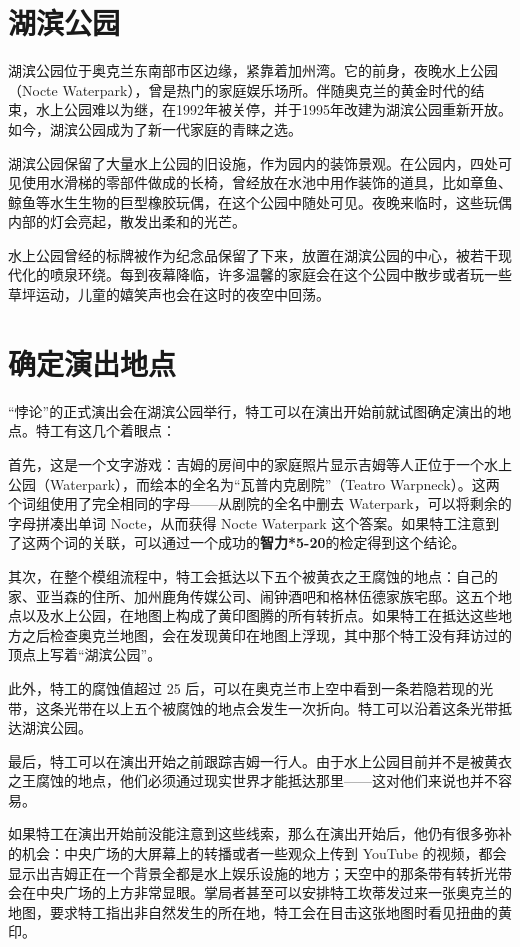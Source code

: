 \section{湖滨公园}

湖滨公园位于奥克兰东南部市区边缘，紧靠着加州湾。它的前身，夜晚水上公园（Nocte Waterpark），曾是热门的家庭娱乐场所。伴随奥克兰的黄金时代的结束，水上公园难以为继，在1992年被关停，并于1995年改建为湖滨公园重新开放。如今，湖滨公园成为了新一代家庭的青睐之选。

湖滨公园保留了大量水上公园的旧设施，作为园内的装饰景观。在公园内，四处可见使用水滑梯的零部件做成的长椅，曾经放在水池中用作装饰的道具，比如章鱼、鲸鱼等水生生物的巨型橡胶玩偶，在这个公园中随处可见。夜晚来临时，这些玩偶内部的灯会亮起，散发出柔和的光芒。

水上公园曾经的标牌被作为纪念品保留了下来，放置在湖滨公园的中心，被若干现代化的喷泉环绕。每到夜幕降临，许多温馨的家庭会在这个公园中散步或者玩一些草坪运动，儿童的嬉笑声也会在这时的夜空中回荡。

\section{确定演出地点}

“悖论”的正式演出会在湖滨公园举行，特工可以在演出开始前就试图确定演出的地点。特工有这几个着眼点：

首先，这是一个文字游戏：吉姆的房间中的家庭照片显示吉姆等人正位于一个水上公园（Waterpark），而绘本的全名为“瓦普内克剧院”（Teatro Warpneck）。这两个词组使用了完全相同的字母——从剧院的全名中删去 Waterpark，可以将剩余的字母拼凑出单词 Nocte，从而获得 Nocte Waterpark 这个答案。如果特工注意到了这两个词的关联，可以通过一个成功的\textbf{智力*5-20}的检定得到这个结论。

其次，在整个模组流程中，特工会抵达以下五个被黄衣之王腐蚀的地点：自己的家、亚当森的住所、加州鹿角传媒公司、闹钟酒吧和格林伍德家族宅邸。这五个地点以及水上公园，在地图上构成了黄印图腾的所有转折点。如果特工在抵达这些地方之后检查奥克兰地图，会在发现黄印在地图上浮现，其中那个特工没有拜访过的顶点上写着“湖滨公园”。

此外，特工的腐蚀值超过 25 后，可以在奥克兰市上空中看到一条若隐若现的光带，这条光带在以上五个被腐蚀的地点会发生一次折向。特工可以沿着这条光带抵达湖滨公园。

最后，特工可以在演出开始之前跟踪吉姆一行人。由于水上公园目前并不是被黄衣之王腐蚀的地点，他们必须通过现实世界才能抵达那里——这对他们来说也并不容易。

如果特工在演出开始前没能注意到这些线索，那么在演出开始后，他仍有很多弥补的机会：中央广场的大屏幕上的转播或者一些观众上传到 YouTube 的视频，都会显示出吉姆正在一个背景全都是水上娱乐设施的地方；天空中的那条带有转折光带会在中央广场的上方非常显眼。掌局者甚至可以安排特工坎蒂发过来一张奥克兰的地图，要求特工指出非自然发生的所在地，特工会在目击这张地图时看见扭曲的黄印。